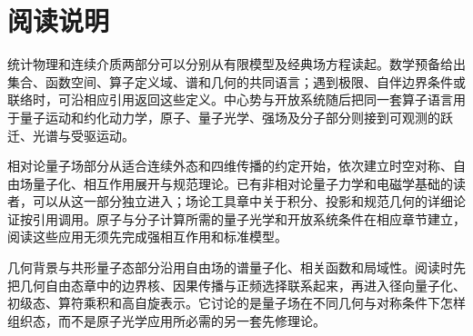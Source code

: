 \section*{阅读说明}

统计物理和连续介质两部分可以分别从有限模型及经典场方程读起。数学预备给出集合、函数空间、算子定义域、谱和几何的共同语言；遇到极限、自伴边界条件或联络时，可沿相应引用返回这些定义。中心势与开放系统随后把同一套算子语言用于量子运动和约化动力学，原子、量子光学、强场及分子部分则接到可观测的跃迁、光谱与受驱运动。

相对论量子场部分从适合连续外态和四维传播的约定开始，依次建立时空对称、自由场量子化、相互作用展开与规范理论。已有非相对论量子力学和电磁学基础的读者，可以从这一部分独立进入；场论工具章中关于积分、投影和规范几何的详细论证按引用调用。原子与分子计算所需的量子光学和开放系统条件在相应章节建立，阅读这些应用无须先完成强相互作用和标准模型。

几何背景与共形量子态部分沿用自由场的谱量子化、相关函数和局域性。阅读时先把几何自由态章中的边界核、因果传播与正频选择联系起来，再进入径向量子化、初级态、算符乘积和高自旋表示。它讨论的是量子场在不同几何与对称条件下怎样组织态，而不是原子光学应用所必需的另一套先修理论。
